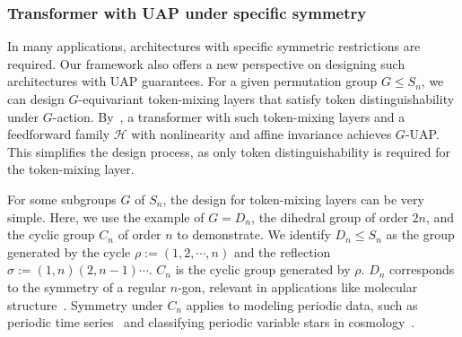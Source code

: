 \documentclass{article}
\begin{document}
\subsubsection{Transformer with UAP under specific symmetry}


In many applications, architectures with specific symmetric restrictions are required. Our framework also offers a new perspective on designing such architectures with UAP guarantees. For a given permutation group $G\le S_n$, we can design $G$-equivariant token-mixing layers that satisfy token distinguishability under $G$-action. By~, a transformer with such token-mixing layers and a feedforward family $\mathcal H$ with nonlinearity and affine invariance achieves $G$-UAP. This simplifies the design process, as only token distinguishability is required for the token-mixing layer.

For some subgroups $G$ of $S_n$, the design for token-mixing layers can be very simple. Here, we use the example of $G=D_n$, the dihedral group of order $2n$, and the cyclic group $C_n$ of order $n$ to demonstrate. We identify $D_n\le S_n$ as the group generated by the cycle $\rho:=(1,2,\cdots,n)$ and the reflection $\sigma:=(1,n)(2,n-1)\cdots$. 
$C_n$ is the cyclic group generated by $\rho$.
$D_n$ corresponds to the symmetry of a regular $n$-gon, relevant in applications like molecular structure~\cite{bunker2006molecular,kittel2018introduction,gilmer2017neural}. Symmetry under $C_n$ applies to modeling periodic data, such as periodic time series~\cite{he2019stcnn,fan2022depts} and classifying periodic variable stars in cosmology~\cite{zhang2021classification}.
\end{document}
